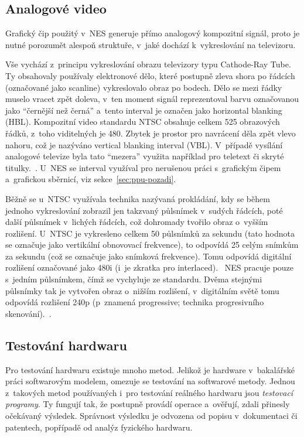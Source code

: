 \subsection{Analogové video}
Grafický čip použitý v~NES generuje přímo analogový kompozitní signál, proto je nutné porozumět alespoň struktuře, v~jaké dochází k~vykreslování na televizoru.

Vše vychází z~principu vykreslování obrazu televizory typu Cathode-Ray Tube. Ty obsahovaly používaly elektronové dělo, které postupně zleva shora po řádcích (označované jako scanline) vykreslovalo obraz po bodech. Dělo se mezi řádky muselo vracet zpět doleva, v~ten moment signál reprezentoval barvu označovanou jako \enquote{černější než černá} a~tento interval je označen jako horizontal blanking (HBL). Kompozitní video standardu NTSC obsahuje celkem 525 obrazových řádků, z~toho viditelných je 480. Zbytek je prostor pro navrácení děla zpět vlevo nahoru, což je nazýváno vertical blanking interval (VBL). V~případě vysílání analogové televize byla tato \enquote{mezera} využita například pro teletext či skryté titulky.~\cite{Poynton2012:video}. U~NES se interval využíval pro nerušenou práci s~grafickým čipem a~grafickou sběrnicí, viz sekce~\ref{sec:ppu-pozadi}.

\begin{note}
Běžně se u~NTSC využívala technika nazývaná prokládání, kdy se během jednoho vykreslování zobrazil jen takzvaný půlsnímek v~sudých řádcích, poté další půlsnímek v~lichých řádcích, což dohromady tvořilo obraz o~vyšším rozlišení. U~NTSC je vykresleno celkem 50 půlsnímků za sekundu (tato hodnota se označuje jako vertikální obnovovací frekvence), to odpovídá 25 celým snímkům za sekundu (což se označuje jako snímková frekvence). Tomu odpovídá digitální rozlišení označované jako 480i (i~je zkratka pro interlaced).~\cite{Poynton2012:video} NES pracuje pouze s~jedním půlsnímkem, čímž se vychyluje ze standardu. Dvěma stejnými půlsnímky tak je vytvořen obraz o~nižším rozlišení, v~digitálním světě tomu odpovídá rozlišení 240p (p~znamená progressive; technika progresivního skenování).~\cite{Nesdev:ntsc}.
\end{note}

\subsection{Testování hardwaru}
Pro testování hardwaru existuje mnoho metod. Jelikož je hardware v~bakalářské práci softwarovým modelem, omezuje se testování na softwarové metody. Jednou z~takových metod používaných i~pro testování reálného hardwaru jsou \emph{testovací programy}. Ty fungují tak, že postupně provádí operace a~ověřují, zdali přinesly očekávaný výsledek. Správnost výsledku je odvozena od popisu v~dokumentaci či patentech, popřípadě od analýz fyzického hardwaru.


